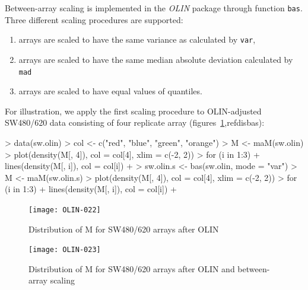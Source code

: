 \documentclass[a4paper,11pt]{article}
\begin{document}
Between-array scaling is implemented in the \emph{OLIN} package through function \texttt{bas}.
Three different scaling procedures are supported: 
\begin{enumerate}
\item  arrays are scaled to have the same variance as calculated by
\texttt{var},
\item  arrays are scaled to have the same median absolute deviation calculated by \texttt{mad}
\item arrays are scaled to have  equal values of quantiles. 
\end{enumerate}

For illustration, we apply the first scaling procedure to  OLIN-adjusted SW480/620 data consisting of four
replicate array (figures~\ref{disolin},ref{disbas}):

 
\begin{Schunk}
\begin{Sinput}
> data(sw.olin)
> col <- c("red", "blue", "green", "orange")
> M <- maM(sw.olin)
> plot(density(M[, 4]), col = col[4], xlim = c(-2, 2))
> for (i in 1:3) {
+     lines(density(M[, i]), col = col[i])
+ }
> sw.olin.s <- bas(sw.olin, mode = "var")
> M <- maM(sw.olin.s)
> plot(density(M[, 4]), col = col[4], xlim = c(-2, 2))
> for (i in 1:3) {
+     lines(density(M[, i]), col = col[i])
+ }
\end{Sinput}
\end{Schunk}



\begin{figure}[t]
\centering
\texttt{[image: OLIN-022]}
\caption{Distribution of M for SW480/620 arrays after OLIN  }
\label{disolin}
\end{figure}


\begin{figure}[t]
\centering
\texttt{[image: OLIN-023]}
\caption{Distribution of M for SW480/620 arrays after OLIN and between-array scaling}
\label{disbas}
\end{figure}




 


\end{document}
